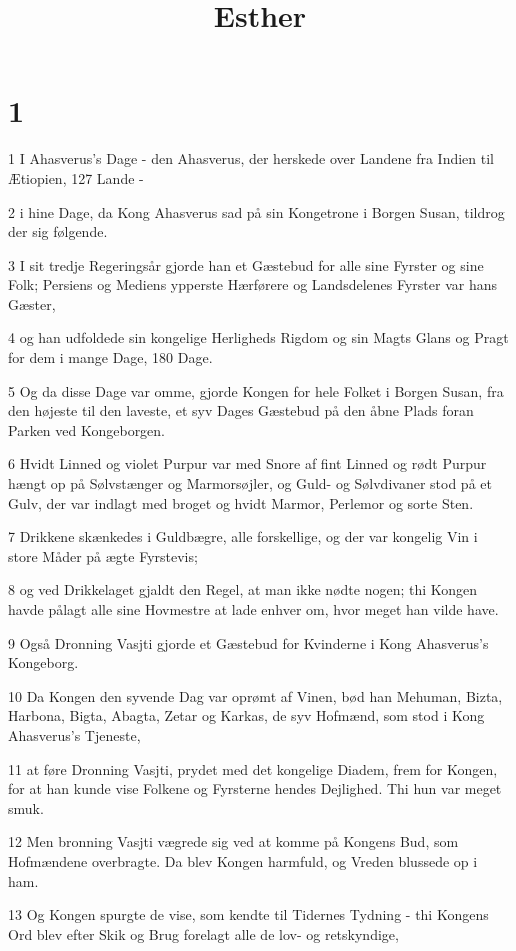 

\title{Esther}


\chapter{1}

\par 1 I Ahasverus's Dage - den Ahasverus, der herskede over Landene fra Indien til Ætiopien, 127 Lande -
\par 2 i hine Dage, da Kong Ahasverus sad på sin Kongetrone i Borgen Susan, tildrog der sig følgende.
\par 3 I sit tredje Regeringsår gjorde han et Gæstebud for alle sine Fyrster og sine Folk; Persiens og Mediens ypperste Hærførere og Landsdelenes Fyrster var hans Gæster,
\par 4 og han udfoldede sin kongelige Herligheds Rigdom og sin Magts Glans og Pragt for dem i mange Dage, 180 Dage.
\par 5 Og da disse Dage var omme, gjorde Kongen for hele Folket i Borgen Susan, fra den højeste til den laveste, et syv Dages Gæstebud på den åbne Plads foran Parken ved Kongeborgen.
\par 6 Hvidt Linned og violet Purpur var med Snore af fint Linned og rødt Purpur hængt op på Sølvstænger og Marmorsøjler, og Guld- og Sølvdivaner stod på et Gulv, der var indlagt med broget og hvidt Marmor, Perlemor og sorte Sten.
\par 7 Drikkene skænkedes i Guldbægre, alle forskellige, og der var kongelig Vin i store Måder på ægte Fyrstevis;
\par 8 og ved Drikkelaget gjaldt den Regel, at man ikke nødte nogen; thi Kongen havde pålagt alle sine Hovmestre at lade enhver om, hvor meget han vilde have.
\par 9 Også Dronning Vasjti gjorde et Gæstebud for Kvinderne i Kong Ahasverus's Kongeborg.
\par 10 Da Kongen den syvende Dag var oprømt af Vinen, bød han Mehuman, Bizta, Harbona, Bigta, Abagta, Zetar og Karkas, de syv Hofmænd, som stod i Kong Ahasverus's Tjeneste,
\par 11 at føre Dronning Vasjti, prydet med det kongelige Diadem, frem for Kongen, for at han kunde vise Folkene og Fyrsterne hendes Dejlighed. Thi hun var meget smuk.
\par 12 Men bronning Vasjti vægrede sig ved at komme på Kongens Bud, som Hofmændene overbragte. Da blev Kongen harmfuld, og Vreden blussede op i ham.
\par 13 Og Kongen spurgte de vise, som kendte til Tidernes Tydning - thi Kongens Ord blev efter Skik og Brug forelagt alle de lov- og retskyndige,
